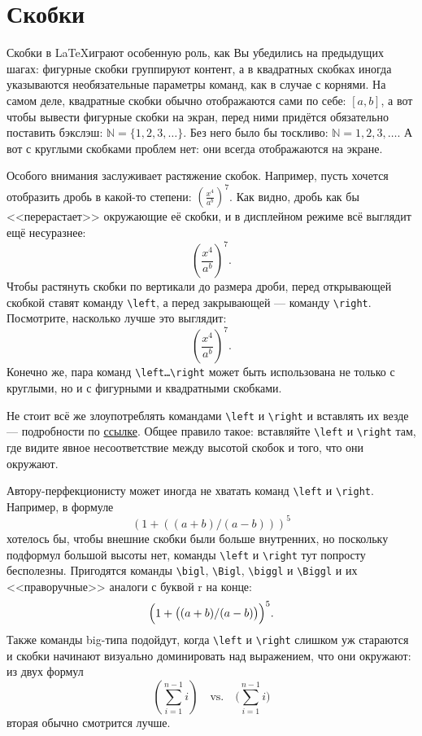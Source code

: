 \section{Скобки}
\par Скобки в \LaTeX играют особенную роль, как Вы убедились на предыдущих шагах: фигурные скобки группируют контент, а в квадратных скобках иногда указываются необязательные параметры команд, как в случае с корнями. На самом деле, квадратные скобки обычно отображаются сами по себе: \( [a,b] \), а вот чтобы вывести фигурные скобки на экран, перед ними придётся обязательно поставить бэкслэш: \( \mathbb{N} = \{1,2,3,\ldots\} \). Без него было бы тоскливо: \( \mathbb{N} = {1,2,3,\ldots} \). А вот с круглыми скобками проблем нет: они всегда отображаются на экране.
\par Особого внимания заслуживает растяжение скобок. Например, пусть хочется отобразить дробь в какой-то степени: \( (\frac{x^4}{a^b})^7 \). Как видно, дробь как бы <<перерастает>> окружающие её скобки, и в дисплейном режиме всё выглядит ещё несуразнее: \[ (\frac{x^4}{a^b})^7 .\]
Чтобы растянуть скобки по вертикали до размера дроби, перед открывающей скобкой ставят команду \verb"\left", а перед закрывающей --- команду \verb"\right". Посмотрите, насколько лучше это выглядит: \[ \left(\frac{x^4}{a^b}\right)^7 .\]
Конечно же, пара команд \verb"\left…\right" может быть использована не только с круглыми, но и с фигурными и квадратными скобками.
\par Не стоит всё же злоупотреблять командами \verb"\left" и \verb"\right" и вставлять их везде --- подробности по \href{https://tex.stackexchange.com/a/58641}{ссылке}. Общее правило такое: вставляйте \verb"\left" и \verb"\right" там, где видите явное несоответствие между высотой скобок и того, что они окружают.
\par Автору-перфекционисту может иногда не хватать команд \verb"\left" и \verb"\right". Например, в формуле \[\left( 1 + \left( \left( a+b \right)/\left(a-b\right) \right) \right)^5\] хотелось бы, чтобы внешние скобки были больше внутренних, но поскольку подформул большой высоты нет, команды \verb"\left" и \verb"\right" тут попросту бесполезны. Пригодятся команды \verb"\bigl", \verb"\Bigl", \verb"\biggl" и \verb"\Biggl"\index{\bigl,\Bigl,\biggl,\Biggl,\bigr,\Bigr,\biggr,\Biggr} и их <<праворучные>> аналоги с буквой r на конце: \[\Bigl( 1 + \bigl( (a+b)/(a-b) \bigr) \Bigr)^5.\]
Также команды big-типа подойдут, когда \verb"\left" и \verb"\right" слишком уж стараются и скобки начинают визуально доминировать над выражением, что они окружают: из двух формул
\[
\left( \sum_{i=1}^{n-1} i \right)
\quad\text{vs.}\quad
\biggl(\sum_{i=1}^{n-1} i\biggr)
\]
вторая обычно смотрится лучше.

